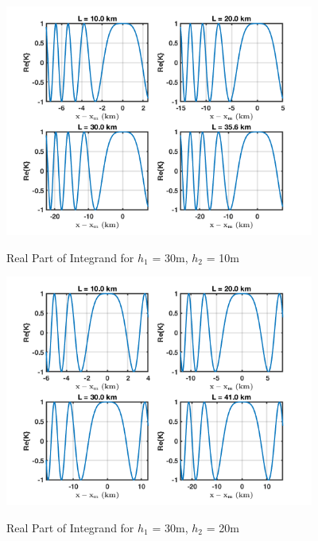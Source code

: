 \begin{figure}[H]
  \begin{center}
\includegraphics[width=4in]{../media/analysis/phaseVariation_30_10}
  \end{center}
  \renewcommand{\baselinestretch}{1} \small\normalsize
  \begin{quote}
    \caption[Real Part of Integrand for $h_1$ = 30m, $h_2$ = 10m]{ Real Part of Integrand for $h_1$ = 30m, $h_2$ = 10m\label{mp_fig:3}}
  \end{quote}
\end{figure}
\renewcommand{\baselinestretch}{2} \small\normalsize

\begin{figure}[H]
  \begin{center}
\includegraphics[width=4in]{../media/analysis/phaseVariation_30_20}
  \end{center}
  \renewcommand{\baselinestretch}{1} \small\normalsize
  \begin{quote}
  \caption[Real Part of Integrand for $h_1$ = 30m, $h_2$ = 20m]{ Real Part of Integrand for $h_1$ = 30m, $h_2$ = 20m\label{mp_fig:4}}
  \end{quote}
\end{figure}
\renewcommand{\baselinestretch}{2} \small\normalsize

